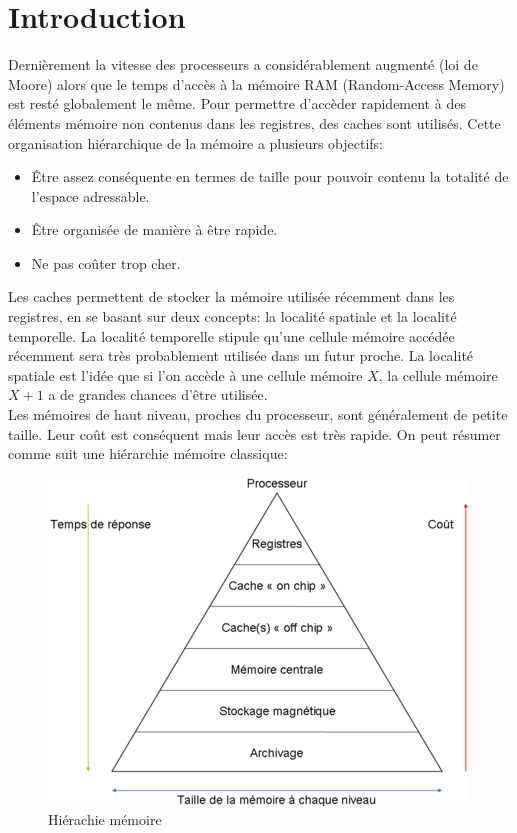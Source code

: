 \documentclass[a4paper]{article}
\begin{document}


\newpage
\tableofcontents

\newpage
\section*{Introduction}

\indent Dernièrement la vitesse des processeurs a considérablement augmenté (loi de Moore) alors que le temps d'accès à la mémoire RAM (Random-Access Memory) est resté globalement le même. Pour permettre d'accèder rapidement à des éléments mémoire non contenus dans les registres, des caches sont utilisés. Cette organisation hiérarchique de la mémoire a plusieurs objectifs: \\
\begin{itemize}
\item \^Etre assez conséquente en termes de taille pour pouvoir contenu la totalité de l'espace adressable.
\item \^Etre organisée de manière à être rapide.
\item Ne pas coûter trop cher. \\
\end{itemize}

\indent Les caches permettent de stocker la mémoire utilisée récemment dans les registres, en se basant sur deux concepts: la localité spatiale et la localité temporelle. La localité temporelle stipule qu'une cellule mémoire accédée récemment sera très probablement utilisée dans un futur proche. La localité spatiale est l'idée que si l'on accède à une cellule mémoire $X$, la cellule mémoire $X+1$ a de grandes chances d'être utilisée. \\

\indent Les mémoires de haut niveau, proches du processeur, sont généralement de petite taille. Leur coût est conséquent mais leur accès est très rapide. On peut résumer comme suit une hiérarchie mémoire classique: \\

\begin{figure}[!h]
\begin{center}
   \includegraphics[scale=0.75]{hierarchy.png}
   \caption{\label{hierarchy} Hiérachie mémoire}
\end{center}
\end{figure}
\end{document}
